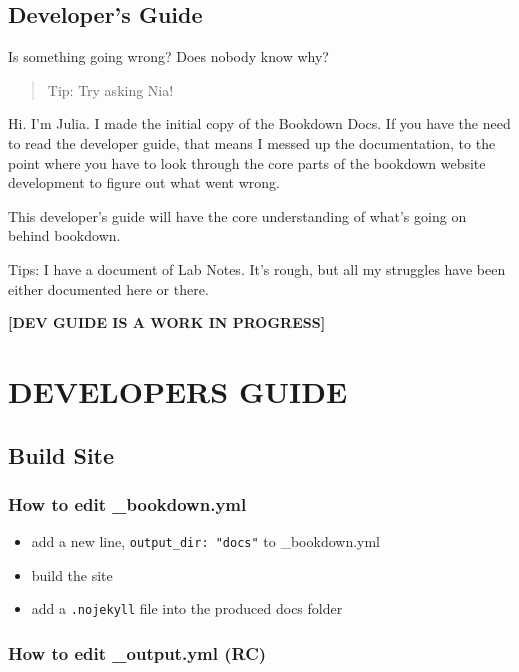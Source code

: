 \documentclass[
]{book}
\providecommand{\tightlist}{%
  \setlength{\itemsep}{0pt}\setlength{\parskip}{0pt}}
\theoremstyle{definition}
\theoremstyle{definition}
\theoremstyle{definition}
\theoremstyle{definition}
\theoremstyle{remark}
\begin{document}
\chapter{Developer's Guide}\label{developers-guide}

Is something going wrong? Does nobody know why?

\begin{quote}
Tip: Try asking Nia!
\end{quote}

Hi. I'm Julia. I made the initial copy of the Bookdown Docs. If you have the need to read the developer guide, that means I messed up the documentation, to the point where you have to look through the core parts of the bookdown website development to figure out what went wrong.

This developer's guide will have the core understanding of what's going on behind bookdown.

Tips: I have a document of Lab Notes. It's rough, but all my struggles have been either documented here or there.

\textbf{{[}DEV GUIDE IS A WORK IN PROGRESS{]}}

\part{DEVELOPERS GUIDE}\label{part-developers-guide}

\chapter{Build Site}\label{build-site}

\section{How to edit \_bookdown.yml}\label{how-to-edit-_bookdown.yml}

\begin{itemize}
\tightlist
\item
  add a new line, \texttt{output\_dir:\ "docs"} to \_bookdown.yml
\item
  build the site
\item
  add a \texttt{.nojekyll} file into the produced docs folder
\end{itemize}

\section{How to edit \_output.yml (RC)}\label{how-to-edit-_output.yml-rc}
\end{document}
